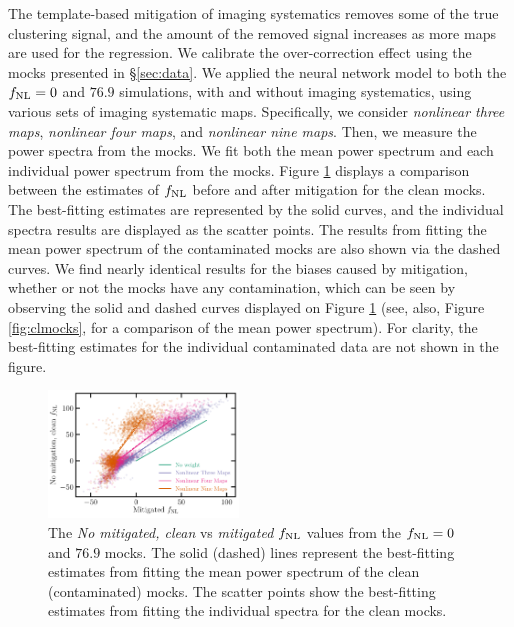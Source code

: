 The template-based mitigation of imaging systematics removes some of the true clustering signal, and the amount of the removed signal increases as more maps are used for the regression. We calibrate the over-correction effect using the mocks presented in \S \ref{sec:data}. We applied the neural network model to both the $f_{\rm NL}=0$ and $76.9$ simulations, with and without imaging systematics, using various sets of imaging systematic maps. Specifically, we consider \textit{nonlinear three maps}, \textit{nonlinear four maps}, and \textit{nonlinear nine maps}. Then, we measure the power spectra from the mocks. We fit both the mean power spectrum and each individual power spectrum from the mocks. Figure \ref{fig:fnlbias} displays a comparison between the estimates of $f_{\rm NL}$ before and after mitigation for the clean mocks. The best-fitting estimates are represented by the solid curves, and the individual spectra results are displayed as the scatter points. The results from fitting the mean power spectrum of the contaminated mocks are also shown via the dashed curves. We find nearly identical results for the biases caused by mitigation, whether or not the mocks have any contamination, which can be seen by observing the solid and dashed curves displayed on Figure \ref{fig:fnlbias} (see, also, Figure \ref{fig:clmocks}, for a comparison of the mean power spectrum). For clarity, the best-fitting estimates for the individual contaminated data are not shown in the figure.


\begin{figure}
\centering
\includegraphics[width=0.45\textwidth]{figures/fnlbias}
\caption{The \textit{No mitigated, clean} vs \textit{mitigated} $f_{\rm NL}$ values from the $f_{\rm NL}=0$ and $76.9$ mocks. The solid (dashed) lines represent the best-fitting estimates from fitting the mean power spectrum of the clean (contaminated) mocks. The scatter points show the best-fitting estimates from fitting the individual spectra for the clean mocks.}\label{fig:fnlbias}
\end{figure}

